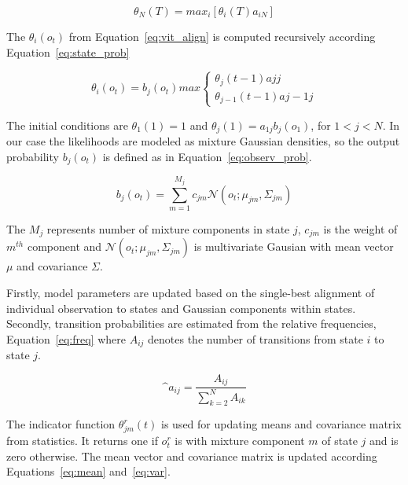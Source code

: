 {\begin{equation}\label{eq:vit_align}
    \theta_N(T)= max_i[\theta_i(T)a_{iN}] 
\end{equation}


The $\theta_i(o_t)$ from Equation~\ref{eq:vit_align} is computed recursively according Equation~\ref{eq:state_prob}

\begin{equation}\label{eq:state_prob}
    \theta_i(o_t) = b_j(o_t) max \left\{
  \begin{array}{lr}
      \theta_j(t-1)a{jj}\\
      \theta_{j-1}(t-1)a{j-1j}
  \end{array}
\right.
\end{equation}

The initial conditions are $\theta_1(1)=1$ and $\theta_j(1)= a_{1j}b_j(o_1)$, for $ 1 < j < N$.
In our case the likelihoods are modeled as mixture Gaussian densities, so the output probability $b_j(o_t)$ is defined as in Equation~\ref{eq:observ_prob}.

\begin{equation}\label{eq:observ_prob}
    b_j(o_t) = \sum_{m=1}^{M_j}{c_{jm}\mathcal{N}(o_t; \mu_{jm}, \Sigma_{jm})}
\end{equation}

The $M_j$ represents number of mixture components in state $j$, $c_{jm}$ is the weight of $m^{th}$ component and $\mathcal{N}(o_t; \mu_{jm}, \Sigma_{jm})$
is multivariate Gausian with mean vector $\mu$ and covariance $\Sigma$.

Firstly, model parameters are updated based on the single-best alignment of individual observation to states and Gaussian components within states.
Secondly, transition probabilities are estimated from the relative frequencies, Equation~\ref{eq:freq} where $A_{ij}$ denotes the number of transitions from state $i$ to state $j$.

\begin{equation}\label{eq:freq}
    \^{a}_{ij} = \frac{A_{ij}}{\sum_{k=2}^{N}{A_{ik}}}
\end{equation}

The indicator function $\theta^r_{jm}(t)$ is used for updating means and covariance matrix from statistics.
It returns one if $o^r_t$ is  with mixture component $m$ of state $j$ and is zero otherwise.
The mean vector and covariance matrix is updated according Equations~\ref{eq:mean} and~\ref{eq:var}.

}
